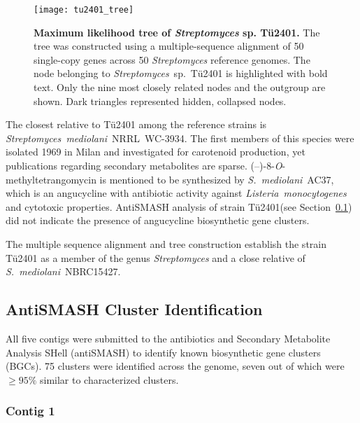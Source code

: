\begin{figure}[htbp]
	\texttt{[image: tu2401\_tree]}
	\caption[Maximum likelihood tree of \emph{Streptomyces} sp. Tü2401.]{%
		\textbf{Maximum likelihood tree of \emph{Streptomyces} sp. Tü2401.}
		The tree was constructed using a multiple-sequence alignment of 50 single-copy genes across 50 \textit{Streptomyces} reference genomes.
		The node belonging to \textit{Streptomyces}~sp.~Tü2401 is highlighted with bold text.
		Only the nine most closely related nodes and the outgroup are shown.
		Dark triangles represented hidden, collapsed nodes.}
	\label{fig:phylo_tree}
\end{figure}

The closest relative to Tü2401 among the reference strains is \emph{Streptomyces~mediolani}~NRRL~WC-3934.
The first members of this species were isolated 1969 in Milan and investigated for carotenoid production, yet publications regarding secondary metabolites are sparse.\autocite{Arcamone1969,Bianchi1970}
(--)-8-\emph{O}-methyltetrangomycin is mentioned to be synthesized by \emph{S.~mediolani}~AC37, which is an angucycline with antibiotic activity against \emph{Listeria~monocytogenes} and cytotoxic properties.\autocite{Maruna2010,Jimenez2012}
AntiSMASH analysis of strain Tü2401(see Section~\ref{sub:antismash_cluster_identification}) did not indicate the presence of angucycline biosynthetic gene clusters.

The multiple sequence alignment and tree construction establish the strain Tü2401 as a member of the genus \emph{Streptomyces} and a close relative of \emph{S.~mediolani}~NBRC15427.


\subsection{AntiSMASH Cluster Identification} %
\label{sub:antismash_cluster_identification}


All five contigs were submitted to the antibiotics and Secondary Metabolite Analysis SHell (antiSMASH) to identify known biosynthetic gene clusters (BGCs).\autocite{Weber2015,Blin2013,Medema2011}
75 clusters were identified across the genome, seven out of which were $\geq 95 \%$ similar to characterized clusters.

\subsubsection*{Contig 1}

